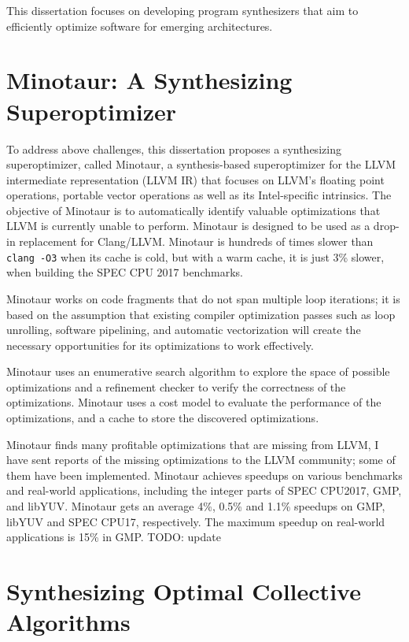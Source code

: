This dissertation focuses on developing program synthesizers that aim
to efficiently optimize software for emerging architectures.


\section{Minotaur: A Synthesizing Superoptimizer}

To address above challenges, this dissertation proposes a synthesizing
superoptimizer, called Minotaur,
a synthesis-based superoptimizer for the LLVM intermediate
representation (LLVM IR) that focuses on LLVM's floating point operations,
portable vector operations as well as its Intel-specific intrinsics.
%
The objective of Minotaur is to automatically identify valuable
optimizations that LLVM is currently unable to perform.
Minotaur is designed to be used as a drop-in replacement for Clang/LLVM.
Minotaur is hundreds of times slower than \texttt{clang -O3} when its
cache is cold, but with a warm cache, it is just 3\% slower, when
building the SPEC CPU 2017 benchmarks.

Minotaur works on code fragments that do not span multiple loop
iterations; it is based on the assumption that existing compiler
optimization passes such as loop unrolling, software pipelining, and
automatic vectorization will create the necessary opportunities for
its optimizations to work effectively.

Minotaur uses an enumerative search algorithm to explore the space of
possible optimizations and a refinement checker to verify the
correctness of the optimizations.
Minotaur uses a cost model to evaluate the performance of the
optimizations, and a cache to store the discovered optimizations.

Minotaur finds many profitable optimizations that are missing from
LLVM,
%
I have sent reports of the missing optimizations to the LLVM community;
some of them have been implemented.
%
Minotaur achieves speedups on various benchmarks and
real-world applications, including the integer parts of SPEC CPU2017,
GMP, and libYUV. Minotaur gets an average 4\%, 0.5\% and 1.1\% speedups
on GMP, libYUV and SPEC CPU17, respectively. The maximum speedup on
real-world applications is 15\% in GMP. TODO: update

\section{Synthesizing Optimal Collective Algorithms}

